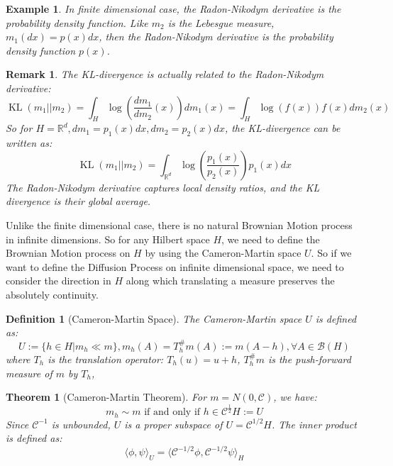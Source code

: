\documentclass{article}
\newtheorem{theorem}{Theorem}
\newtheorem{definition}{Definition}
\newtheorem{remark}{Remark}
\newtheorem{example}{Example}
\begin{document}
\begin{example}
  In finite dimensional case, the Radon-Nikodym derivative is the probability density function. 
  Like $m_2$ is the Lebesgue measure, $m_1(dx) = p(x)dx$, then the Radon-Nikodym derivative is the probability density function $p(x)$. 
\end{example}

\begin{remark}
  The KL-divergence is actually related to the Radon-Nikodym derivative:
  \begin{equation}
    \operatorname{KL}(m_1||m_2) = \int_H \log\left(\frac{dm_1}{dm_2}(x)\right) dm_1(x) 
    = \int_H \log\left(f(x)\right) f(x)dm_2(x)
  \end{equation}
  So for $H=\mathbb{R}^d, dm_1 = p_1(x)dx, dm_2 = p_2(x)dx$, the KL-divergence can be written as:
  \begin{equation}
    \operatorname{KL}(m_1||m_2) = \int_{\mathbb{R}^d} \log\left(\frac{p_1(x)}{p_2(x)}\right) p_1(x) dx
  \end{equation}
  The Radon-Nikodym derivative captures local density ratios, and the KL divergence is their global average.
\end{remark}

Unlike the finite dimensional case, there is no natural Brownian Motion process in infinite dimensions. 
So for any Hilbert space $H$, we need to define the Brownian Motion process on $H$ by using the Cameron-Martin space $U$.
So if we want to define the Diffusion Process on infinite dimensional space, 
we need to consider the direction in $H$ along which translating a measure preserves the absolutely continuity.

\begin{definition}[Cameron-Martin Space]
The Cameron-Martin space $U$ is defined as:
\begin{equation}
  U:=\{h\in H| m_h\ll m\},m_h(A)=T_h^\#m(A):= m(A-h),\forall A \in \mathcal{B}(H)
\end{equation} 
where $T_h$ is the translation operator: $T_h(u)=u + h$, $T_h^\#m$ is the push-forward measure of $m$ by $T_h$, 
\end{definition}


\begin{theorem}[Cameron-Martin Theorem]
  For $m=N(0, \mathcal{C})$, we have:
  \begin{equation}
    m_h\sim m \text{ if and only if } h\in \mathcal{C}^\frac{1}{2}H:=U
  \end{equation}
  Since $\mathcal{C}^{-1}$ is unbounded, $U$ is a proper subspace of $U = \mathcal{C}^{1/2}H$.
  The inner product is defined as:
\begin{equation}
  \langle \phi, \psi\rangle_U = \langle \mathcal{C}^{-1/2}\phi, \mathcal{C}^{-1/2}\psi\rangle_H
\end{equation}
\end{theorem}
\end{document}
